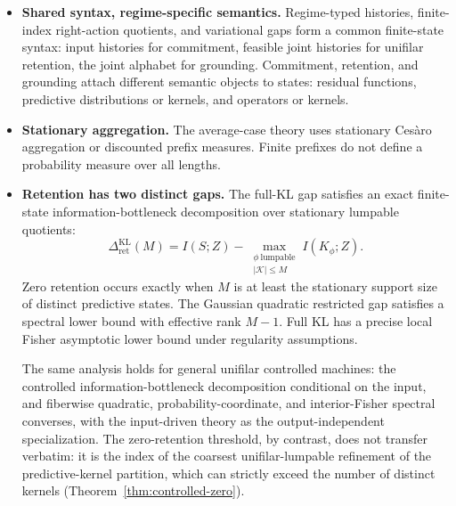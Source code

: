 \documentclass[12pt]{article}
\theoremstyle{definition}
\newcommand{\RetKL}{\Delta_{\mathrm{ret}}^{\mathrm{KL}}}
\begin{document}
\begin{itemize}[leftmargin=1.8em]
\item \textbf{Shared syntax, regime-specific semantics.}
Regime-typed histories, finite-index right-action quotients, and variational
gaps form a common finite-state syntax: input histories for commitment,
feasible joint histories for unifilar retention, the joint alphabet for
grounding.  Commitment, retention, and grounding attach different semantic
objects to states: residual functions, predictive distributions or kernels,
and operators or kernels.

\item \textbf{Stationary aggregation.}
The average-case theory uses stationary Ces\`aro aggregation or discounted
prefix measures.  Finite prefixes do not define a probability measure over
all lengths.

\item \textbf{Retention has two distinct gaps.}
The full-KL gap satisfies an exact finite-state information-bottleneck
decomposition over stationary lumpable quotients:
\[
\RetKL(M)
=
I(S;Z)
-
\max_{\substack{
\phi\ \text{lumpable}\\
|\mathcal K|\le M
}}
I(K_\phi;Z).
\]
Zero retention occurs exactly when $M$ is at least the stationary support size
of distinct predictive states.  The Gaussian quadratic restricted gap satisfies
a spectral lower bound with effective rank $M-1$.  Full KL has a precise local
Fisher asymptotic lower bound under regularity assumptions.

The same analysis holds for general unifilar controlled machines: the
controlled information-bottleneck decomposition conditional on the input, and
fiberwise quadratic, probability-coordinate, and interior-Fisher spectral
converses, with the input-driven theory as the output-independent
specialization.  The zero-retention threshold, by contrast, does not transfer
verbatim: it is the index of the coarsest unifilar-lumpable refinement of the
predictive-kernel partition, which can strictly exceed the number of distinct
kernels (Theorem~\ref{thm:controlled-zero}).


\end{itemize}
\end{document}
